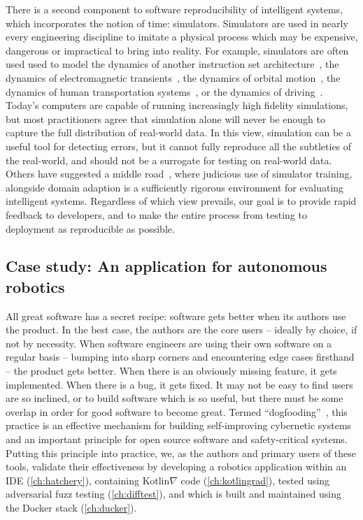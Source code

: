 \documentclass[12pt,initial,twoside,maitrise]{dms}
\numberwithin{equation}{section}
\numberwithin{table}{chapter}
\numberwithin{figure}{chapter}
\begin{document}
There is a second component to software reproducibility of intelligent systems, which incorporates the notion of time: simulators. Simulators are used in nearly every engineering discipline to imitate a physical process which may be expensive, dangerous or impractical to bring into reality. For example, simulators are often used used to model the dynamics of another instruction set architecture~\citep{bellard2005qemu}, the dynamics of electromagnetic transients~\citep{tavante2018opensi}, the dynamics of orbital motion~\citep{bellman1965wengert}, the dynamics of human transportation systems~\citep{ruch2018amodeus}, or the dynamics of driving~\citep{gym_duckietown}. Today's computers are capable of running increasingly high fidelity simulations, but most practitioners agree that simulation alone will never be enough to capture the full distribution of real-world data. In this view, simulation can be a useful tool for detecting errors, but it cannot fully reproduce all the subtleties of the real-world, and should not be a surrogate for testing on real-world data. Others have suggested a middle road~\citep{bousmalis2018using}, where judicious use of simulator training, alongside domain adaption is a sufficiently rigorous environment for evaluating intelligent systems. Regardless of which view prevails, our goal is to provide rapid feedback to developers, and to make the entire process from testing to deployment as reproducible as possible.

\subsection{Case study: An application for autonomous robotics}\label{subsec:case-study}

All great software has a secret recipe: software gets better when its authors use the product. In the best case, the authors are the core users -- ideally by choice, if not by necessity. When software engineers are using their own software on a regular basis -- bumping into sharp corners and encountering edge cases firsthand -- the product gets better. When there is an obviously missing feature, it gets implemented. When there is a bug, it gets fixed. It may not be easy to find users are so inclined, or to build software which is so useful, but there must be some overlap in order for good software to become great. Termed ``dogfooding''~\citep{harrison2006eating}, this practice is an effective mechanism for building self-improving cybernetic systems and an important principle for open source software and safety-critical systems. Putting this principle into practice, we, as the authors and primary users of these tools, validate their effectiveness by developing a robotics application within an IDE (\autoref{ch:hatchery}), containing Kotlin$\nabla$ code (\autoref{ch:kotlingrad}), tested using adversarial fuzz testing (\autoref{ch:difftest}), and which is built and maintained using the Docker stack (\autoref{ch:ducker}).
\end{document}
